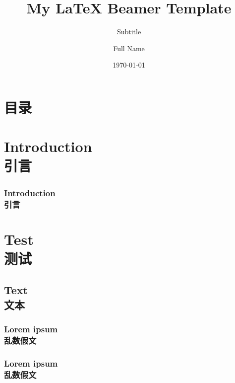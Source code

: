 \documentclass[aspectratio=169]{beamer}
\begin{document}
\title{
My \LaTeX%
Beamer Template
}
\subtitle{Subtitle}
\author[Name]{Full Name}
\date{\today}

\begin{frame}
\maketitle
\end{frame}

\section*{目录}
\begin{frame}
\frametitle{\secname}
\tableofcontents[hideallsubsections]
\end{frame}

\section{Introduction\\引言}
\begin{frame}
\frametitle{Introduction\\引言}
\lipsum[1]
\end{frame}

\begin{frame}
\zhlipsum[1]
\end{frame}

\section{Test\\测试}
\subsection{Text\\文本}
\subsubsection{Lorem ipsum\\乱数假文}
\begin{frame}
\frametitle{Lorem ipsum\\乱数假文}
\lipsum[2]
\end{frame}

\begin{frame}
\zhlipsum[2]
\end{frame}
\end{document}
